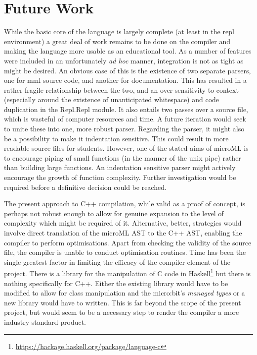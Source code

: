 \documentclass[12pt, a4paper]{report}
\begin{document}
\section{Future Work}
While the basic core of the language is largely complete (at least in the repl environment) a great
deal of work remains to be done on the compiler and making the language more usable as an educational
tool. As a number of features were included in an unfortunately \textit{ad hoc} manner, integration
is not as tight as might be desired. An obvious case of this is the existence of two separate
parsers, one for mml source code, and another for documentation. This has resulted in a rather
fragile relationship between the two, and an over-sensitivity to context (especially around the
existence of unanticipated whitespace) and code duplication in the Repl.Repl module. It also entails
two passes over a source file, which is wasteful of computer resources and time. A future iteration
would seek to unite these into one, more robust parser. Regarding the parser, it might also be a
possibility to make it indentation sensitive. This could result in more readable source files for
students. However, one of the stated aims of microML is to encourage piping of small functions (in
the manner of the unix pipe) rather than building large functions. An indentation sensitive parser
might actively encourage the growth of function complexity. Further investigation would be required
before a definitive decision could be reached.

The present approach to C++ compilation, while valid as a proof of concept, is perhaps not robust
enough to allow for genuine expansion to the level of complexity which might be required of it.
Alternative, better, strategies would involve direct translation of the microML AST to the C++ AST,
enabling the compiler to perform optimisations. Apart from checking the validity of the source file,
the compiler is unable to conduct optimisation routines. Time has been the single greatest factor in
limiting the efficacy of the compiler element of the project. There is a library for the manipulation
of C code in Haskell\footnote{\url{https://hackage.haskell.org/package/language-c}} but there is
nothing specifically for C++. Either the existing library would have  to be modified to allow for
class manipulation and the micro:bit's \textit{managed types} or a new library would have to
written. This is far beyond the scope of the present project, but would seem to be a necessary step
to render the compiler a more industry standard product.
\end{document}

